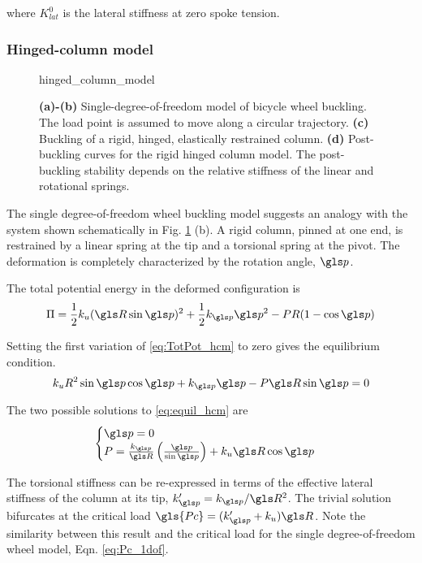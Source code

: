 \documentclass[\rootdir/thesis.tex]{subfiles}
\begin{document}
where $K_{lat}^0$ is the lateral stiffness at zero spoke tension.

\subsubsection*{Hinged-column model}

\begin{figure}[t]	
\centering
{hinged_column_model}
\caption{\textbf{(a)-(b)} Single-degree-of-freedom model of bicycle wheel buckling. The load point is assumed to move along a circular trajectory. \textbf{(c)} Buckling of a rigid, hinged, elastically restrained column. \textbf{(d)} Post-buckling curves for the rigid hinged column model. The post-buckling stability depends on the relative stiffness of the linear and rotational springs.}
\label{fig:hinged_column_model}
\end{figure}

The single degree-of-freedom wheel buckling model suggests an analogy with the system shown schematically in Fig. \ref{fig:hinged_column_model} (b). A rigid column, pinned at one end, is restrained by a linear spring at the tip and a torsional spring at the pivot. The deformation is completely characterized by the rotation angle, $\p$.

The total potential energy in the deformed configuration is
\begin{equation}
\label{eq:TotPot_hcm}
\Pi = \frac{1}{2}k_u(\R\sin{\p})^2 + \frac{1}{2}k_{\p}\p^2
    - PR(1-\cos{\p})
\end{equation}

Setting the first variation of \eqref{eq:TotPot_hcm} to zero gives the equilibrium condition.
\begin{equation}
\label{eq:equil_hcm}
k_u R^2 \sin{\p}\cos{\p} + k_{\p}\p - P\R\sin{\p} = 0
\end{equation}

The two possible solutions to \eqref{eq:equil_hcm} are
\begin{equation}
\label{eq:P_hcm}
\begin{cases}
\p = 0\\
P = \frac{k_{\p}}{\R}\left(\frac{\p}{\sin{\p}}\right) + k_u \R\cos{\p}
\end{cases}
\end{equation}

The torsional stiffness can be re-expressed in terms of the effective lateral stiffness of the column at its tip, $k'_{\p}=k_{\p}/\R^2$. The trivial solution bifurcates at the critical load $\gls{Pc}=(k'_{\p} + k_u) \R$. Note the similarity between this result and the critical load for the single degree-of-freedom wheel model, Eqn. \eqref{eq:Pc_1dof}.
\end{document}
